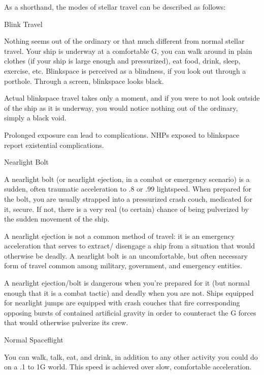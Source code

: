 As a shorthand, the modes of stellar travel can be described as follows:
 

Blink Travel
 

Nothing seems out of the ordinary or that much different from normal stellar travel. Your ship is  
underway at a comfortable G, you can walk around in plain clothes (if your ship is large enough  
and pressurized), eat food, drink, sleep, exercise, etc. Blinkspace is perceived as a blindness, if  
you look out through a porthole. Through a screen, blinkspace looks black. 
 

Actual blinkspace travel takes only a moment, and if you were to not look outside of the ship as it  
is underway, you would notice nothing out of the ordinary, simply a black void. 
 

Prolonged exposure can lead to complications. NHPs exposed to blinkspace report existential  
complications. 
 

Nearlight Bolt  

A nearlight bolt (or nearlight ejection, in a combat or emergency scenario) is a sudden, often  
traumatic acceleration to .8 or .99 lightspeed. When prepared for the bolt, you are usually  
strapped into a pressurized crash couch, medicated for it, secure. If not, there is a very real (to  
certain) chance of being pulverized by the sudden movement of the ship. 
 

A nearlight ejection is not a common method of travel: it is an emergency acceleration that  
serves to extract/ disengage a ship from a situation that would otherwise be deadly. A nearlight  
bolt is an uncomfortable, but often necessary form of travel common among military,  
government, and emergency entities. 
 

A nearlight ejection/bolt is dangerous when you’re prepared for it (but normal enough that it is a  
combat tactic) and deadly when you are not. Ships equipped for nearlight jumps are equipped  
with crash couches that fire corresponding opposing bursts of contained artificial gravity in order  
to counteract the G forces that would otherwise pulverize its crew. 
 

Normal Spaceflight  

                                                                                                           


You can walk, talk, eat, and drink, in addition to any other activity you could do on a .1 to 1G  
world. This speed is achieved over slow, comfortable acceleration.    
 

